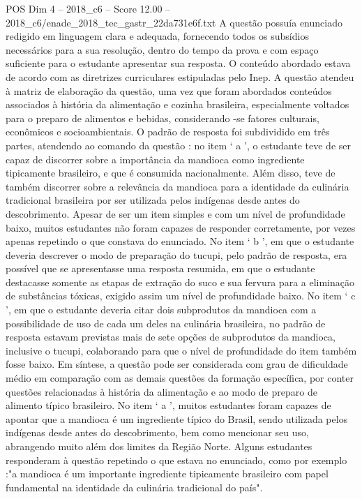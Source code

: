 \begin{textsample}{POS Dim 4 – 2018\_c6 – Score 12.00 – 2018\_c6/enade\_2018\_tec\_gastr\_22da731e6f.txt}
A questão possuía enunciado redigido em linguagem clara e adequada, fornecendo todos os subsídios necessários para a sua resolução, dentro do tempo da prova e com espaço suficiente para o estudante apresentar sua resposta.
O conteúdo abordado estava de acordo com as diretrizes curriculares estipuladas pelo Inep.
A questão atendeu à matriz de elaboração da questão, uma vez que foram abordados conteúdos associados à história da alimentação e cozinha brasileira, especialmente voltados para o preparo de alimentos e bebidas, considerando -se fatores culturais, econômicos e socioambientais.
O padrão de resposta foi subdividido em três partes, atendendo ao comando da questão : no item ‘ a ’, o estudante teve de ser capaz de discorrer sobre a importância da mandioca como ingrediente tipicamente brasileiro, e que é consumida nacionalmente.
Além disso, teve de também discorrer sobre a relevância da mandioca para a identidade da culinária tradicional brasileira por ser utilizada pelos indígenas desde antes do descobrimento.
Apesar de ser um item simples e com um nível de profundidade baixo, muitos estudantes não foram capazes de responder corretamente, por vezes apenas repetindo o que constava do enunciado.
No item ‘ b ’, em que o estudante deveria descrever o modo de preparação do tucupi, pelo padrão de resposta, era possível que se apresentasse uma resposta resumida, em que o estudante destacasse somente as etapas de extração do suco e sua fervura para a eliminação de substâncias tóxicas, exigido assim um nível de profundidade baixo.
No item ‘ c ’, em que o estudante deveria citar dois subprodutos da mandioca com a possibilidade de uso de cada um deles na culinária brasileira, no padrão de resposta estavam previstas mais de sete opções de subprodutos da mandioca, inclusive o tucupi, colaborando para que o nível de profundidade do item também fosse baixo.
Em síntese, a questão pode ser considerada com grau de dificuldade médio em comparação com as demais questões da formação específica, por conter questões relacionadas à história da alimentação e ao modo de preparo de alimento típico brasileiro.
No item ‘ a ’, muitos estudantes foram capazes de apontar que a mandioca é um ingrediente típico do Brasil, sendo utilizada pelos indígenas desde antes do descobrimento, bem como mencionar seu uso, abrangendo muito além dos limites da Região Norte.
Alguns estudantes responderam à questão repetindo o que estava no enunciado, como por exemplo :"a mandioca é um importante ingrediente tipicamente brasileiro com papel fundamental na identidade da culinária tradicional do país".

\end{textsample}
